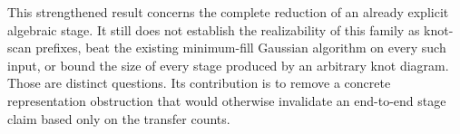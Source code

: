 This strengthened result concerns the complete reduction of an already
explicit algebraic stage.  It still does not establish the realizability of
this family as knot-scan prefixes, beat the existing minimum-fill Gaussian
algorithm on every such input, or bound the size of every stage produced by
an arbitrary knot diagram.  Those are distinct questions.  Its contribution
is to remove a concrete representation obstruction that would otherwise
invalidate an end-to-end stage claim based only on the transfer counts.
